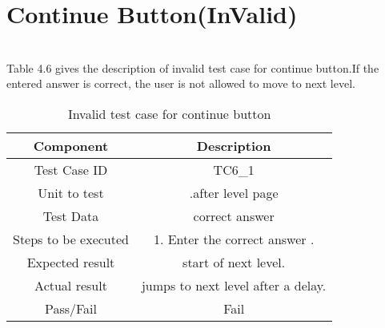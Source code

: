 \section{Continue Button(InValid)}
\hspace{1cm} \\
Table 4.6 gives the description of  invalid test case for continue button.If the entered answer is correct, the user  is not allowed to move to next level.\\
\vspace{1cm}
\begin{table}[htb!]
\label{table :tc11}
\centering %
\begin{tabular}{c c} %
\hline\hline %
 Component & Description \\ [0.5ex] %
\hline %
Test Case ID & TC6\_1   \\
Unit to test &.after level page \\ 
Test Data &correct answer\\
Steps to be executed &1. Enter the correct answer .\\
Expected result  &start of next level.\\ 
Actual result &jumps to next level after a delay.\\
Pass/Fail &Fail\\


\hline %
\end{tabular}
\caption{Invalid test case for continue button} \label{table:tc11} %
\end{table}

